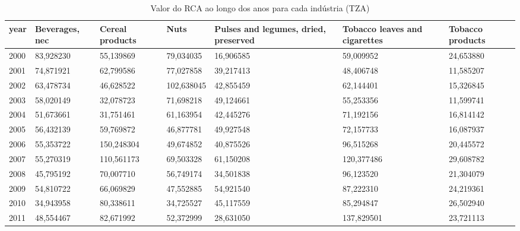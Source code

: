 \begin{table}
\centering
\caption{Valor do RCA ao longo dos anos para cada indústria (TZA)}
\begin{tabular}{p{1cm}p{2cm}p{2cm}p{2cm}p{2cm}p{2cm}p{2cm}}
\toprule
 year &  Beverages, nec &  Cereal products &       Nuts &  Pulses and legumes, dried, preserved &  Tobacco leaves and cigarettes &  Tobacco products \\
\midrule
 2000 &       83,928230 &        55,139869 &  79,034035 &                             16,906585 &                      59,009952 &         24,653880 \\
 2001 &       74,871921 &        62,799586 &  77,027858 &                             39,217413 &                      48,406748 &         11,585207 \\
 2002 &       63,478734 &        46,628522 & 102,638045 &                             42,855459 &                      62,144401 &         15,326845 \\
 2003 &       58,020149 &        32,078723 &  71,698218 &                             49,124661 &                      55,253356 &         11,599741 \\
 2004 &       51,673661 &        31,751461 &  61,163954 &                             42,445276 &                      71,192156 &         16,814142 \\
 2005 &       56,432139 &        59,769872 &  46,877781 &                             49,927548 &                      72,157733 &         16,087937 \\
 2006 &       55,353722 &       150,248304 &  49,674852 &                             40,875526 &                      96,515268 &         20,445572 \\
 2007 &       55,270319 &       110,561173 &  69,503328 &                             61,150208 &                     120,377486 &         29,608782 \\
 2008 &       45,795192 &        70,007710 &  56,749174 &                             34,501838 &                      96,123520 &         21,304079 \\
 2009 &       54,810722 &        66,069829 &  47,552885 &                             54,921540 &                      87,222310 &         24,219361 \\
 2010 &       34,943958 &        80,338611 &  34,725527 &                             45,117559 &                      85,294847 &         26,502940 \\
 2011 &       48,554467 &        82,671992 &  52,372999 &                             28,631050 &                     137,829501 &         23,721113 \\

\end{tabular}
\end{table}
